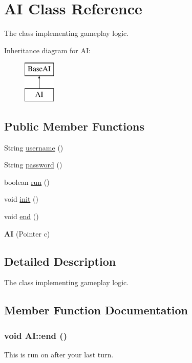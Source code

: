 \hypertarget{classAI}{
\section{AI Class Reference}
\label{classAI}
}


The class implementing gameplay logic.  


Inheritance diagram for AI:\begin{figure}[H]
\begin{center}
\leavevmode
\includegraphics[height=2cm]{classAI}
\end{center}
\end{figure}
\subsection*{Public Member Functions}
\begin{DoxyCompactItemize}
\item 
String \hyperlink{classAI_ad7e6db6b414a192ad2af8656d012cfdc}{username} ()
\item 
String \hyperlink{classAI_a405047fd39e03de993183392a06d655b}{password} ()
\item 
boolean \hyperlink{classAI_af25b3a076daef2aaf9f74ecf458bdfbc}{run} ()
\item 
void \hyperlink{classAI_a8c8e3a635791abaa61585357e6a25f63}{init} ()
\item 
void \hyperlink{classAI_a67b00a8dd5c6d73db2e4e2332826462e}{end} ()
\item 
\hypertarget{classAI_a8487ba177f1c1431a134c2b56b94ad8b}{
{\bfseries AI} (Pointer c)}
\label{classAI_a8487ba177f1c1431a134c2b56b94ad8b}

\end{DoxyCompactItemize}


\subsection{Detailed Description}
The class implementing gameplay logic. 

\subsection{Member Function Documentation}
\hypertarget{classAI_a67b00a8dd5c6d73db2e4e2332826462e}{
\subsubsection[{end}]{\setlength{\rightskip}{0pt plus 5cm}void AI::end ()}}
\label{classAI_a67b00a8dd5c6d73db2e4e2332826462e}
This is run on after your last turn. 


